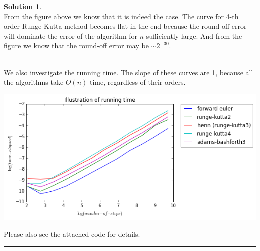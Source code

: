 \documentclass[a4paper, 10pt]{article}
\theoremstyle{definition}
\theoremstyle{hSol}
\newtheorem*{solution}{Solution}
\begin{document}
\begin{solution}
~\\
From the figure above we know that it is indeed the case. The curve for 4-th order Runge-Kutta method becomes flat in the end because the round-off error will dominate the error of the algorithm for $n$ sufficiently large. And from the figure we know that the round-off error may be $\sim 2^{-30}$.

~\\
We also investigate the running time. The slope of these curves are 1, because all the algorithms take $O(n)$ time, regardless of their orders.

\begin{center}
\includegraphics[scale=0.7]{hw2_p3.png}
\end{center}


Please also see the attached code for details.
\end{solution} 
\noindent\rule{16cm}{0.4pt}
\end{document}
